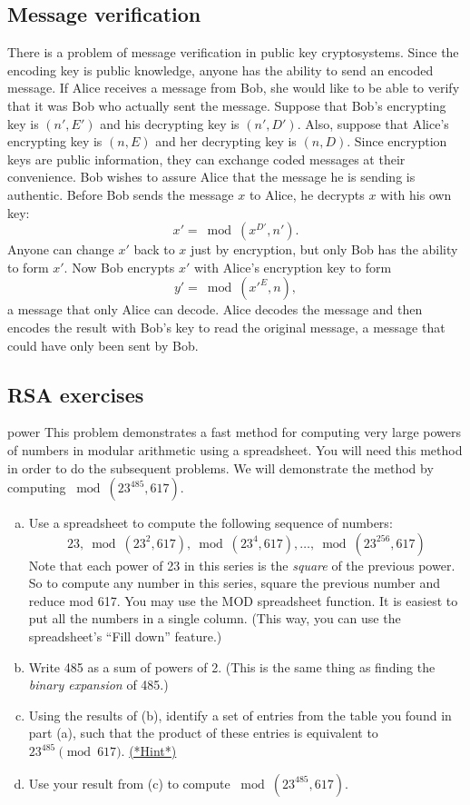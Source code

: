 \subsection{Message verification}
 
 
There is a problem of message verification in public key
cryptosystems. Since the encoding key is public knowledge, anyone has
the ability to send an encoded message.  If Alice receives a message
from Bob, she would like to be able to verify that it was Bob who
actually sent the message. Suppose that Bob's encrypting key is $(n',
E')$ and his decrypting key is $(n', D')$.  Also, suppose that Alice's
encrypting key is $(n, E)$ and her decrypting key is $(n, D)$.  Since
encryption keys are public information, they can exchange coded
messages at their convenience.  Bob wishes to assure Alice that the
message he is sending is authentic. Before Bob sends the message $x$
to Alice, he decrypts  $x$ with his own key:
$$
x' =  \bmod(x ^{D'}, n').
$$
Anyone can change $x'$ back to $x$ just by encryption, but only Bob
has the ability to form $x'$. Now Bob encrypts $x'$ with Alice's
encryption key to form 
$$
y' = \bmod({x'}^E,   n),
$$
a message that only Alice can decode.  Alice decodes the message and
then encodes the result with Bob's key to read the original message, a
message that could have only been sent by Bob.
 

\subsection{RSA exercises}
 

\begin{exercise}{power}
This problem demonstrates a fast method for computing very large powers of numbers in modular arithmetic using a spreadsheet.  You will need this method in order to do the subsequent problems. We will demonstrate the method by computing $\bmod(23^{485} ,617)$.
\begin{enumerate}[(a)]
\item
Use a spreadsheet to compute the following sequence of numbers:
\[ 23, \bmod(23^2 ,617),\bmod(23^4 ,617),\ldots,\bmod(23^{256} ,617) \]
Note that each power of 23 in this series is the  \emph{square} of the previous power.  So to compute any number in this series, square the previous number and reduce mod 617.  You may use the MOD spreadsheet function.  It is easiest to put all the numbers in a single column. (This way, you can use the spreadsheet's ``Fill down'' feature.)
\item  Write 485 as a sum of powers of 2.  (This is the same thing as finding the \emph{binary expansion} of 485.)
\item Using the results of (b), identify a set of entries from the table you found in part (a), such that the product of these entries is equivalent to $23^{485}  \pmod{617}$.
\hyperref[sec:crypt:hints]{(*Hint*)}
\item 
Use your result from (c) to compute $\bmod(23^{485} ,617)$.
\end{enumerate}
\end{exercise}

